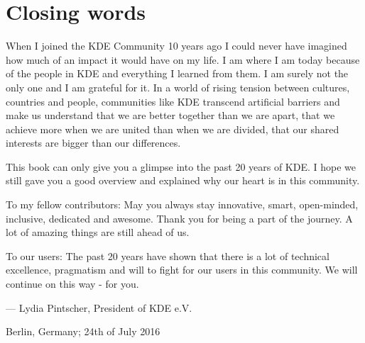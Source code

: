 \chapter*{Closing words}

When I joined the KDE Community 10 years ago I could never have imagined how much of an impact it would have on my life. I am where I am today because of the people in KDE and everything I learned from them. I am surely not the only one and I am grateful for it. In a world of rising tension between cultures, countries and people, communities like KDE transcend artificial barriers and make us understand that we are better together than we are apart, that we achieve more when we are united than when we are divided, that our shared interests are bigger than our differences.

This book can only give you a glimpse into the past 20 years of KDE. I hope we still gave you a good overview and explained why our heart is in this community.

To my fellow contributors: May you always stay innovative, smart, open-minded, inclusive, dedicated and awesome. Thank you for being a part of the journey. A lot of amazing things are still ahead of us.

To our users: The past 20 years have shown that there is a lot of technical excellence, pragmatism and will to fight for our users in this community. We will continue on this way - for you.

\begin{flushright}--- Lydia Pintscher, President of KDE e.V.\end{flushright}
\begin{flushright}Berlin, Germany; 24th of July 2016\end{flushright}
